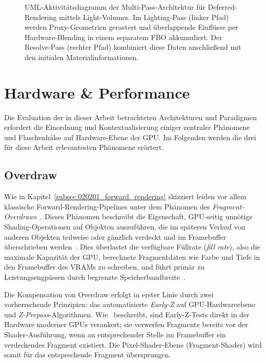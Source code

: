 \begin{figure}[H]
{\begin{tikzpicture}
        \end{tikzpicture}
    }
    \caption[UML-Aktivitätsdiagramm der Multi-Pass-Architektur für Deferred-Rendering mittels Light-Volumes]
    {UML-Aktivitätsdiagramm der Multi-Pass-Architektur für Deferred-Rendering mittels Light-Volumes.
    Im Lighting-Pass (linker Pfad) werden Proxy-Geometrien gerastert und überlappende Einflüsse per Hardware-Blending
    in einem separatem FBO akkumuliert.
    Der Resolve-Pass (rechter Pfad) kombiniert diese Daten anschließend mit den initialen Materialinformationen.}
    \label{fig:deferred_light_volumes_flow}
\end{figure}


\section{Hardware \& Performance}
\label{sec:0203_hardware_and_perfomance_metrics}

Die Evaluation der in dieser Arbeit betrachteten Architekturen und Paradigmen erfordert die Einordnung und
Kontextualisierung einiger zentraler Phänomene und Flaschenhälse auf Hardware-Ebene der \ac{GPU}.
Im Folgenden werden die drei für diese Arbeit relevantesten Phänomene erörtert.

\subsection{Overdraw}
\label{subsec:020301_overdraw}

Wie in Kapitel~\ref{subsec:020201_forward_rendering} skizziert leiden vor allem klassische Forward-Rendering-Pipelines
unter dem Phänomen des \textit{Fragment-Overdraws}~\parencite[vgl.][Abschn.~1.5]{Thaler2011DeferredRendering}.
Dieses Phänomen beschreibt die Eigenschaft, \ac{GPU}-seitig unnötige Shading-Operationen auf Objekten auszuführen, die
im späteren Verlauf von anderen Objekten teilweise oder gänzlich verdeckt und im Framebuffer überschrieben
werden~\parencites(vgl.)()[S.~801--802]{akenine-mollerRealtimeRendering2019}[S.~55]{burnsVisibilityBufferCacheFriendly2013}.
Dies überlastet die verfügbare Füllrate (\textit{fill rate}), also die maximale Kapazität der \ac{GPU},
berechnete Fragmentdaten wie Farbe und Tiefe in den Framebuffer des \ac{VRAM}s zu schreiben, und führt primär zu
Leistungsengpässen durch begrenzte Speicherbandbreite~\parencite[vgl.][S.~788 und 801--802]{akenine-mollerRealtimeRendering2019}.

Die Kompensation von Overdraw erfolgt in erster Linie durch zwei vorherrschende Prinzipien: das automatisierte
\textit{Early-Z} auf \ac{GPU}-Hardwareebene und \textit{Z-Prepass}-Algorithmen.
Wie~\textcite[Kap.~11.2.4.8]{gregoryGameEngineArchitecture2018} beschreibt, sind Early-Z-Tests direkt in der
Hardware moderner \acp{GPU} verankert; sie verwerfen Fragmente bereits vor der Shader-Ausführung, wenn an
entsprechender Stelle im Framebuffer ein verdeckendes Fragment existiert.
Die Pixel-Shader-Ebene (Fragment-Shader) wird somit für das entsprechende Fragment übersprungen.

